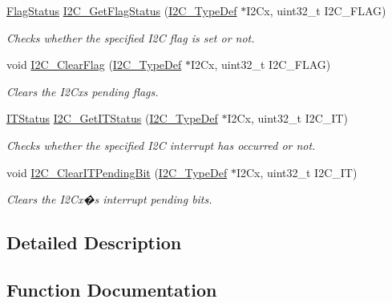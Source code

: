\begin{DoxyCompactItemize}
\hyperlink{group___exported__types_ga89136caac2e14c55151f527ac02daaff}{Flag\+Status} \hyperlink{group___i2_c___private___functions_ga15c95d0ed124f029621a2061b1677ee7}{I2\+C\+\_\+\+Get\+Flag\+Status} (\hyperlink{struct_i2_c___type_def}{I2\+C\+\_\+\+Type\+Def} $\ast$I2\+Cx, uint32\+\_\+t I2\+C\+\_\+\+F\+L\+AG)
\begin{DoxyCompactList}\small\item\em Checks whether the specified I2C flag is set or not. \end{DoxyCompactList}\item 
void \hyperlink{group___i2_c___private___functions_ga9d4f8fe9f7232696114b5578b1223963}{I2\+C\+\_\+\+Clear\+Flag} (\hyperlink{struct_i2_c___type_def}{I2\+C\+\_\+\+Type\+Def} $\ast$I2\+Cx, uint32\+\_\+t I2\+C\+\_\+\+F\+L\+AG)
\begin{DoxyCompactList}\small\item\em Clears the I2\+Cx\textquotesingle{}s pending flags. \end{DoxyCompactList}\item 
\hyperlink{group___exported__types_gaacbd7ed539db0aacd973a0f6eca34074}{I\+T\+Status} \hyperlink{group___i2_c___private___functions_ga447771fbbd94a56f3570b9f430a069ba}{I2\+C\+\_\+\+Get\+I\+T\+Status} (\hyperlink{struct_i2_c___type_def}{I2\+C\+\_\+\+Type\+Def} $\ast$I2\+Cx, uint32\+\_\+t I2\+C\+\_\+\+IT)
\begin{DoxyCompactList}\small\item\em Checks whether the specified I2C interrupt has occurred or not. \end{DoxyCompactList}\item 
void \hyperlink{group___i2_c___private___functions_ga110dda440fa200b5f77349df19b3e6bb}{I2\+C\+\_\+\+Clear\+I\+T\+Pending\+Bit} (\hyperlink{struct_i2_c___type_def}{I2\+C\+\_\+\+Type\+Def} $\ast$I2\+Cx, uint32\+\_\+t I2\+C\+\_\+\+IT)
\begin{DoxyCompactList}\small\item\em Clears the I2\+Cx�s interrupt pending bits. \end{DoxyCompactList}\end{DoxyCompactItemize}


\subsection{Detailed Description}


\subsection{Function Documentation}
\mbox{\label{group___i2_c___private___functions_ga7bb44e894d68a7991f564c43fb187486}} 

